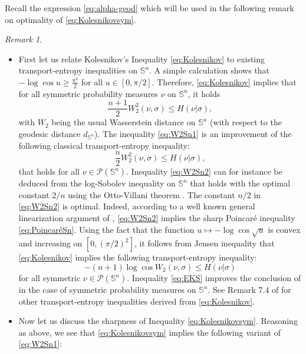 \documentclass[10pt]{amsart}
\theoremstyle{definition}
\theoremstyle{remark}
\newtheorem{rem}[thm]{Remark}
\newcommand{\Sd}{\mathbb{S}}
\begin{document}
Recall the expression \eqref{eq:alpha-geod} which will be used in the following remark on optimality of \eqref{eq:Kolesnikovsym}.

\begin{rem}\label{rem:optimality}\ 
\begin{itemize}
\item First let us relate Kolesnikov's Inequality \eqref{eq:Kolesnikov} to existing transport-entropy inequalities on $\Sd^n$. A simple calculation shows that $-\log \cos u \geq \frac{u^2}{2}$ for all $u \in [0,\pi/2]$. Therefore, \eqref{eq:Kolesnikov} implies that for all symmetric probability measures $\nu$ on $\Sd^n$, it holds
\begin{equation}\label{eq:W2Sn1}
\frac{n+1}{2} W_2^2(\nu,\sigma) \leq H(\nu|\sigma),
\end{equation}
with $W_2$ being the usual Wasserstein distance on $\Sd^n$ (with respect to the geodesic distance $d_{\Sd^n}$). The inequality \eqref{eq:W2Sn1} is an improvement of the following classical transport-entropy inequality: 
\begin{equation}\label{eq:W2Sn2}
\frac{n}{2} W_2^2(\nu,\sigma) \leq H(\nu|\sigma),
\end{equation}
that holds for all $\nu \in \mathcal{P}(\Sd^n)$. Inequality \eqref{eq:W2Sn2} can for instance be deduced from the log-Sobolev inequality on $\Sd^n$ that holds with the optimal constant $2/n$ using the Otto-Villani theorem \cite{OV00}. The constant $n/2$ in \eqref{eq:W2Sn2} is optimal. Indeed, according to a well known general linearization argument of \cite{OV00}, \eqref{eq:W2Sn2} implies the sharp Poincar\'e inequality \eqref{eq:PoincaréSn}. 
Using the fact that the function $u \mapsto - \log \cos \sqrt{u}$ is convex and increasing on $[0,(\pi/2)^2]$, it follows from Jensen inequality that \eqref{eq:Kolesnikov} implies the following transport-entropy inequality:
\begin{equation}\label{eq:EKS}
-(n+1) \log \cos W_2(\nu,\sigma) \leq H(\nu|\sigma)
\end{equation}
for all symmetric $\nu \in \mathcal{P}(\Sd^n)$. Inequality \eqref{eq:EKS} improves the conclusion of \cite[Corollary 3.29]{EKS15} in the case of symmetric probability measures on $\Sd^n$. See Remark 7.4 of \cite{Kol20} for other transport-entropy inequalities derived from \eqref{eq:Kolesnikov}.
\item Now let us discuss the sharpness of Inequality \eqref{eq:Kolesnikovsym}. Reasoning as above, we see that \eqref{eq:Kolesnikovsym} implies the following variant of \eqref{eq:W2Sn1}:

\end{itemize}
\end{rem}
\end{document}
